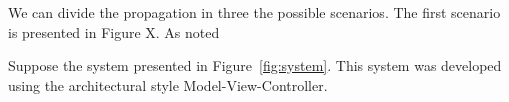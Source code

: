 We can divide the propagation in three the possible scenarios. The first scenario is presented in Figure X. As noted 



Suppose the system presented in Figure~\ref{fig:system}. This system was developed using the architectural style Model-View-Controller.


